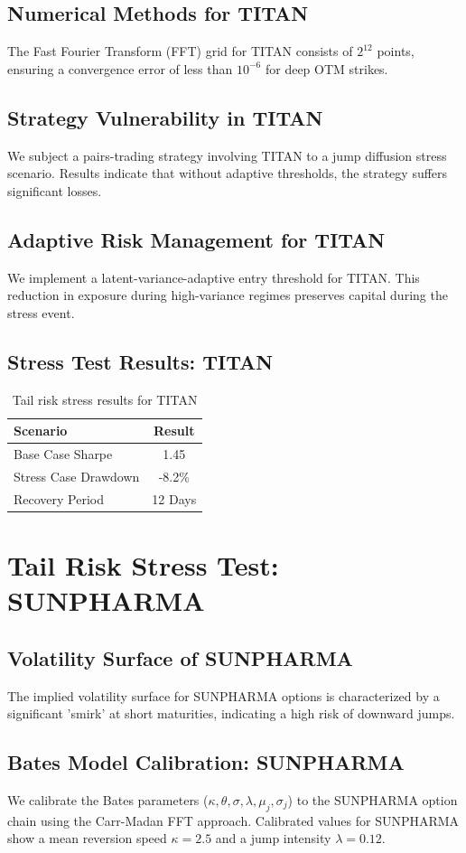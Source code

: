 \documentclass[12pt,a4paper,twoside]{article}
\begin{document}
\subsection{Numerical Methods for TITAN}
The Fast Fourier Transform (FFT) grid for TITAN consists of $2^{12}$ points, ensuring a convergence error of less than $10^{-6}$ for deep OTM strikes.
\subsection{Strategy Vulnerability in TITAN}
We subject a pairs-trading strategy involving TITAN to a jump diffusion stress scenario. Results indicate that without adaptive thresholds, the strategy suffers significant losses.
\subsection{Adaptive Risk Management for TITAN}
We implement a latent-variance-adaptive entry threshold for TITAN. This reduction in exposure during high-variance regimes preserves capital during the stress event.
\subsection{Stress Test Results: TITAN}
\begin{table}[H]
\centering
\begin{tabular}{|l|c|}
\hline
Scenario & Result \\
\hline
Base Case Sharpe & 1.45 \\
Stress Case Drawdown & -8.2\% \\
Recovery Period & 12 Days \\
\hline
\end{tabular}
\caption{Tail risk stress results for TITAN}
\end{table}
\newpage

\section{Tail Risk Stress Test: SUNPHARMA}
\subsection{Volatility Surface of SUNPHARMA}
The implied volatility surface for SUNPHARMA options is characterized by a significant 'smirk' at short maturities, indicating a high risk of downward jumps.
\subsection{Bates Model Calibration: SUNPHARMA}
We calibrate the Bates parameters ($\kappa, \theta, \sigma, \lambda, \mu_j, \sigma_j$) to the SUNPHARMA option chain using the Carr-Madan FFT approach.
Calibrated values for SUNPHARMA show a mean reversion speed $\kappa = 2.5$ and a jump intensity $\lambda = 0.12$.
\end{document}
